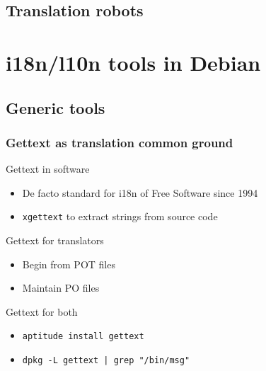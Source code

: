 \documentclass{beamer}
\begin{document}
\begin{frame}
  \frametitle{}
\end{frame}

\subsection{Translation robots}

\begin{frame}
  \frametitle{}
\end{frame}

\begin{frame}
  \frametitle{}
\end{frame}

\begin{frame}
  \frametitle{}
\end{frame}

\begin{frame}
  \frametitle{}
\end{frame}

\section{i18n/l10n tools in Debian}

\subsection{Generic tools}

\begin{frame}
  \frametitle{Gettext as translation common ground}
	\begin{block}
		{Gettext in software}
		\begin{itemize}
		\item
			De facto standard for i18n of Free Software since 1994
		\item
			\texttt{xgettext} to extract strings from source code
		\end{itemize}
	\end{block}
	\begin{block}
		{Gettext for translators}
		\begin{itemize}
		\item
			Begin from POT files
		\item
			Maintain PO files
		\end{itemize}
	\end{block}
	\begin{block}
		{Gettext for both}
		\begin{itemize}
		\item
			\texttt{aptitude install gettext}
		\item
			\texttt{dpkg -L gettext | grep "/bin/msg"}
		\end{itemize}
	\end{block}
\end{frame}
\end{document}
